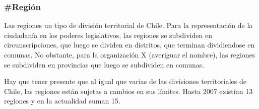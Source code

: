 \subsubsection{\#Región}

Las regiones un tipo de división territorial de Chile. Para la
representación de la ciudadanía en los poderes legislativos, las
regiones se subdividen en circunscripciones, que luego se dividen en
distritos, que terminan dividiendose en comunas. No obstante, para la
organización X (averiguar el nombre), las regiones se subdividen en
provincias que luego se subdividen en comunas.

Hay que tener presente que al igual que varias de las divisiones
territoriales de Chile, las regiones están sujetas a cambios en sus
límites. Hasta 2007 existían 13 regiones y en la actualidad suman 15.

\begin{description}
  
\end{description}